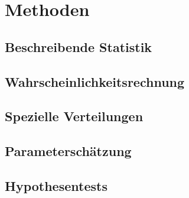 \chapter{Methoden}

\section{Beschreibende Statistik}


\section{Wahrscheinlichkeitsrechnung}


\section{Spezielle Verteilungen}


\section{Parameterschätzung}


\section{Hypothesentests}
